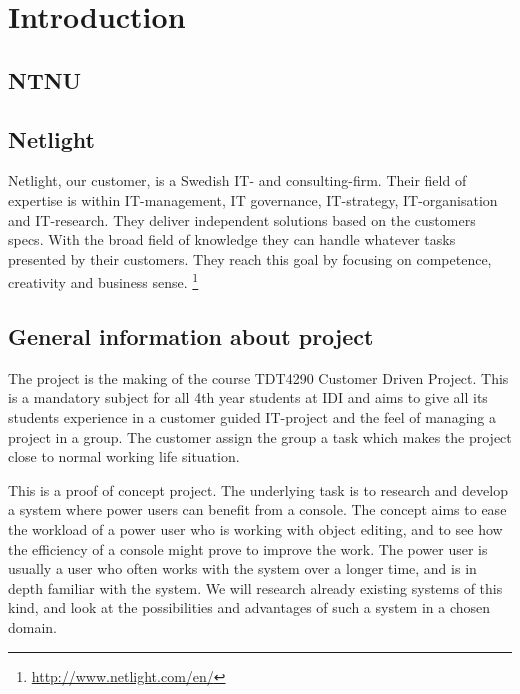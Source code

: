 \chapter{Introduction}

\section{NTNU}

\section{Netlight}
Netlight, our customer, is a Swedish IT- and consulting-firm. Their field of expertise is within IT-management, IT governance, IT-strategy, IT-organisation and IT-research. They deliver independent solutions based on the customers specs. With the broad field of knowledge they can handle whatever tasks presented by their customers. They reach this goal by focusing on competence, creativity and business sense.
\footnote{\url{http://www.netlight.com/en/}}

\section{General information about project}
The project is the making of the course TDT4290 Customer Driven Project. This is a mandatory subject for all 4th year students at IDI and aims to give all its students experience in a customer guided IT-project and the feel of managing a project in a group. The customer assign the group a task which makes the project close to normal working life situation.

This is a proof of concept project. The underlying task is to research and develop a system where power users can benefit from a console.  The concept aims to ease the workload of a power user who is working with object editing, and to see how the efficiency of a console might prove to improve the work. The power user is usually a user who often works with the system over a longer time, and is in depth familiar with the system. We will research already existing systems of this kind, and look at the possibilities and advantages of such a system in a chosen domain.


